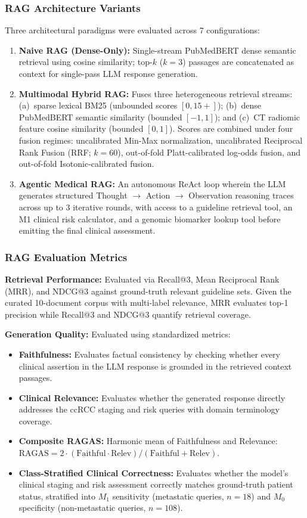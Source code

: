 \subsubsection{RAG Architecture Variants}
Three architectural paradigms were evaluated across 7 configurations:
\begin{enumerate}
    \item \textbf{Naive RAG (Dense-Only):} Single-stream PubMedBERT dense semantic retrieval using cosine similarity; top-$k$ ($k=3$) passages are concatenated as context for single-pass LLM response generation.
    \item \textbf{Multimodal Hybrid RAG:} Fuses three heterogeneous retrieval streams: (a)~sparse lexical BM25 (unbounded scores $[0, 15+]$); (b)~dense PubMedBERT semantic similarity (bounded $[-1, 1]$); and (c)~CT radiomic feature cosine similarity (bounded $[0, 1]$). Scores are combined under four fusion regimes: uncalibrated Min-Max normalization, uncalibrated Reciprocal Rank Fusion (RRF; $k=60$), out-of-fold Platt-calibrated log-odds fusion, and out-of-fold Isotonic-calibrated fusion.
    \item \textbf{Agentic Medical RAG:} An autonomous ReAct loop wherein the LLM generates structured Thought $\to$ Action $\to$ Observation reasoning traces across up to 3 iterative rounds, with access to a guideline retrieval tool, an M1 clinical risk calculator, and a genomic biomarker lookup tool before emitting the final clinical assessment.
\end{enumerate}

\subsubsection{RAG Evaluation Metrics}
\textbf{Retrieval Performance:} Evaluated via Recall@3, Mean Reciprocal Rank (MRR), and NDCG@3 against ground-truth relevant guideline sets. Given the curated 10-document corpus with multi-label relevance, MRR evaluates top-1 precision while Recall@3 and NDCG@3 quantify retrieval coverage.

\textbf{Generation Quality:} Evaluated using standardized metrics:
\begin{itemize}
    \item \textbf{Faithfulness:} Evaluates factual consistency by checking whether every clinical assertion in the LLM response is grounded in the retrieved context passages.
    \item \textbf{Clinical Relevance:} Evaluates whether the generated response directly addresses the ccRCC staging and risk queries with domain terminology coverage.
    \item \textbf{Composite RAGAS:} Harmonic mean of Faithfulness and Relevance: $\text{RAGAS} = 2 \cdot (\text{Faithful} \cdot \text{Relev}) / (\text{Faithful} + \text{Relev})$.
    \item \textbf{Class-Stratified Clinical Correctness:} Evaluates whether the model's clinical staging and risk assessment correctly matches ground-truth patient status, stratified into $M_1$ sensitivity (metastatic queries, $n=18$) and $M_0$ specificity (non-metastatic queries, $n=108$).
\end{itemize}

